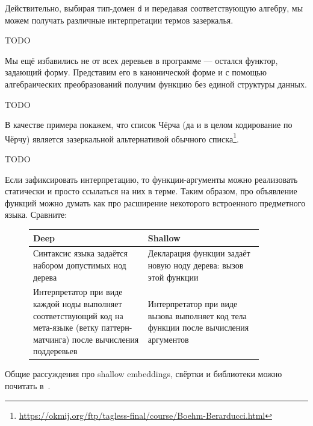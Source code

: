 Действительно, выбирая тип-домен \texttt{d} и передавая соответствующую алгебру, мы можем получать различные интерпретации термов зазеркалья.

TODO %

Мы ещё избавились не от всех деревьев в программе --- остался функтор, задающий форму.
Представим его в канонической форме и с помощью алгебраических преобразований получим функцию без единой структуры данных.

TODO %

В качестве примера покажем, что список Чёрча (да и в целом кодирование по Чёрчу) является зазеркальной альтернативой обычного списка\footnote{\url{https://okmij.org/ftp/tagless-final/course/Boehm-Berarducci.html}}.

TODO %


Если зафиксировать интерпретацию, то функции-аргументы можно реализовать статически и просто ссылаться на них в терме.
Таким образом, про объявление функций можно думать как про расширение некоторого встроенного предметного языка.
Сравните:
\begin{figure}[h]
    \centering
    \begin{tabular}{|p{0.45\linewidth}|p{0.45\linewidth}|}
        \hline
        Deep                                                                                                    & Shallow                                                    \\
        \hline
        Синтаксис языка задаётся набором допустимых нод дерева                                                  & Декларация функции задаёт новую ноду дерева: вызов этой функции       \\
        \hline
        Интерпретатор при виде каждой ноды выполняет соответствующий код на мета-языке (ветку паттерн-матчинга) после вычисления поддеревьев & Интерпретатор при виде вызова выполняет код тела функции после вычисления аргументов \\
        \hline
    \end{tabular}
\end{figure}

Общие рассуждения про shallow embeddings, свёртки и библиотеки можно почитать в~\cite{gibbons2013functional, gibbons2014folding}.

